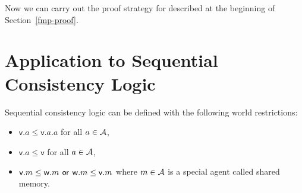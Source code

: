    Now we can carry out the proof strategy for  described
   at the beginning of Section~\ref{fmp-proof}.

  \section{Application to Sequential Consistency Logic}

  Sequential consistency logic can be defined with the following world
  restrictions:
  \begin{itemize}
   \item $\mathsf v.a\le\mathsf v.a.a$ for all $a\in\mathcal A$,
   \item $\mathsf v.a\le\mathsf v$ for all $a\in\mathcal A$,
   \item $\mathsf v.m\le\mathsf w.m\,\mathbin{\mathsf{or}}\,\mathsf w.m\le\mathsf v.m$ where $m\in\mathcal A$ is a special
	 agent called shared memory.
  \end{itemize}

